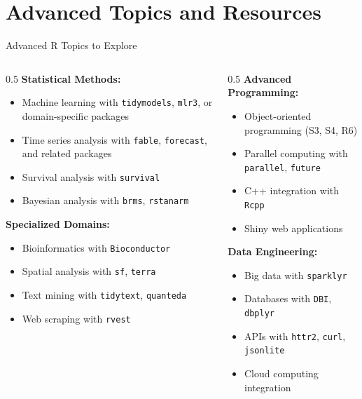 \documentclass[aspectratio=169]{beamer}
\begin{document}
\section{Advanced Topics and Resources}

\begin{frame}{Advanced R Topics to Explore}
  \begin{columns}
    \begin{column}{0.5\textwidth}
      \textbf{Statistical Methods:}
      \begin{itemize}
        \item Machine learning with \texttt{tidymodels}, \texttt{mlr3}, or domain-specific packages
        \item Time series analysis with \texttt{fable}, \texttt{forecast}, and related packages
        \item Survival analysis with \texttt{survival}
        \item Bayesian analysis with \texttt{brms}, \texttt{rstanarm}
      \end{itemize}

      \textbf{Specialized Domains:}
      \begin{itemize}
        \item Bioinformatics with \texttt{Bioconductor}
        \item Spatial analysis with \texttt{sf}, \texttt{terra}
        \item Text mining with \texttt{tidytext}, \texttt{quanteda}
        \item Web scraping with \texttt{rvest}
      \end{itemize}
    \end{column}
    \begin{column}{0.5\textwidth}
      \textbf{Advanced Programming:}
      \begin{itemize}
        \item Object-oriented programming (S3, S4, R6)
        \item Parallel computing with \texttt{parallel}, \texttt{future}
        \item C++ integration with \texttt{Rcpp}
        \item Shiny web applications
      \end{itemize}

      \textbf{Data Engineering:}
      \begin{itemize}
        \item Big data with \texttt{sparklyr}
        \item Databases with \texttt{DBI}, \texttt{dbplyr}
        \item APIs with \texttt{httr2}, \texttt{curl}, \texttt{jsonlite}
        \item Cloud computing integration
      \end{itemize}
    \end{column}
  \end{columns}
\end{frame}
\end{document}
